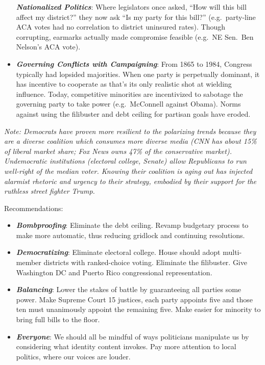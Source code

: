 \documentclass[
]{article}
\begin{document}
\begin{itemize}
  \textbf{\emph{Nationalized Politics}}: Where legislators once asked,
  ``How will this bill affect my district?'' they now ask ``Is my party
  for this bill?'' (e.g.~party-line ACA votes had no correlation to
  district uninsured rates). Though corrupting, earmarks actually made
  compromise feasible (e.g.~NE Sen.~Ben Nelson's ACA vote).
\item
  \textbf{\emph{Governing Conflicts with Campaigning}}: From 1865 to
  1984, Congress typically had lopsided majorities. When one party is
  perpetually dominant, it has incentive to cooperate as that's its only
  realistic shot at wielding influence. Today, competitive minorities
  are incentivized to sabotage the governing party to take power
  (e.g.~McConnell against Obama). Norms against using the filibuster and
  debt ceiling for partisan goals have eroded.
\end{itemize}

\emph{Note: Democrats have proven more resilient to the polarizing
trends because they are a diverse coalition which consumes more diverse
media (CNN has about 15\% of liberal market share; Fox News owns 47\% of
the conservative market). Undemocratic institutions (electoral college,
Senate) allow Republicans to run well-right of the median voter. Knowing
their coalition is aging out has injected alarmist rhetoric and urgency
to their strategy, embodied by their support for the ruthless street
fighter Trump.}

Recommendations:

\begin{itemize}
\item
  \textbf{\emph{Bombproofing}}: Eliminate the debt ceiling. Revamp
  budgetary process to make more automatic, thus reducing gridlock and
  continuing resolutions.
\item
  \textbf{\emph{Democratizing}}: Eliminate electoral college. House
  should adopt multi-member districts with ranked-choice voting.
  Eliminate the filibuster. Give Washington DC and Puerto Rico
  congressional representation.
\item
  \textbf{\emph{Balancing}}: Lower the stakes of battle by guaranteeing
  all parties some power. Make Supreme Court 15 justices, each party
  appoints five and those ten must unanimously appoint the remaining
  five. Make easier for minority to bring full bills to the floor.
\item
  \textbf{\emph{Everyone}}: We should all be mindful of ways politicians
  manipulate us by considering what identity content invokes. Pay more
  attention to local politics, where our voices are louder.
\end{itemize}
\end{document}
